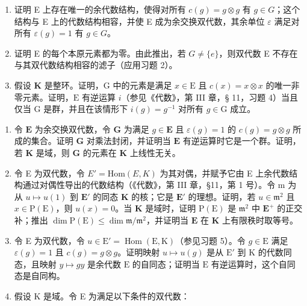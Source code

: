 \begin{enumerate}
\def\labelenumi{(\alph{enumi})}
\item
  证明 E 上存在唯一的余代数结构，使得对所有 \(c(g) = g \otimes g\) 有 \(g \in G\)；这个结构与 E 上的代数结构相容，并使 E 成为余交换双代数，其余单位 \(\varepsilon\) 满足对所有 \(\varepsilon(g) = 1\) 有 \(g \in G\)。
\item
  证明 E 的每个本原元素都为零。由此推出，若 \(G \neq \{e\}\)，则双代数 E 不存在与其双代数结构相容的滤子（应用习题 2）。
\item
  假设 \(\mathbf{K}\) 是整环。证明，\(\mathrm{G}\) 中的元素是满足 \(x\in \mathrm{E}\) 且 \(c(x) = x\otimes x\) 的唯一非零元素。证明，\(\mathrm{E}\) 有逆运算 \(i\)（参见《代数》，第 III 章，§ 11，习题 4）当且仅当 \(\mathrm{G}\) 是群，并且在该情形下 \(i(g) = g^{-1}\) 对所有 \(g\in \mathrm{G}\) 成立。
\end{enumerate}

\begin{enumerate}
\def\labelenumi{\arabic{enumi}.}
\setcounter{enumi}{3}
\item
  令 \(\mathbf{E}\) 为余交换双代数，令 \(\mathbf{G}\) 为满足 \(g \in \mathbf{E}\) 且 \(\varepsilon(g) = 1\) 的 \(c(g) = g \otimes g\) 所成的集合。证明 \(\mathbf{G}\) 对乘法封闭，并证明当 \(\mathbf{E}\) 有逆运算时它是一个群。证明，若 \(\mathbf{K}\) 是域，则 \(\mathbf{G}\) 的元素在 \(\mathbf{K}\) 上线性无关。
\item
  令 E 为双代数，令 \(E' = \text{Hom}(E, K)\) 为其对偶，并赋予它由 E 上余代数结构通过对偶性导出的代数结构（《代数》，第 III 章，§11，第 1 号）。令 m 为从 \(u \mapsto u(1)\) 到 \(\mathbf{E}'\) 的同态 \(\mathbf{K}\) 的核；它是 \(\mathbf{E}'\) 的理想。证明，若 \(u \in \mathfrak{m}^2\) 且 \(x \in \mathrm{P}(\mathrm{E})\)，则 \(u(x) = 0\)。当 \(\mathbf{K}\) 是域时，证明 \(\mathrm{P}(\mathrm{E})\) 是 \(\mathfrak{m}^2\) 中 \(\mathbf{E}^+\) 的正交补；推出 \(\dim \mathrm{P}(\mathrm{E}) \leqslant \dim \mathfrak{m} / \mathfrak{m}^2\)，并证明当 \(\mathbf{E}\) 在 \(\mathbf{K}\) 上有限秩时取等号。
\item
  令 E 为双代数，令 \(u \in \mathrm{E}' = \operatorname{Hom}(\mathrm{E}, \mathrm{K})\)（参见习题 5）。令 \(g \in \mathrm{E}\) 满足 \(\varepsilon(g) = 1\) 且 \(c(g) = g \otimes g\)。证明映射 \(u \mapsto u(g)\) 是从 \(\mathrm{E}'\) 到 \(\mathrm{K}\) 的代数同态，且映射 \(y \mapsto gy\) 是余代数 \(\mathrm{E}\) 的自同态；证明当 \(\mathrm{E}\) 有逆运算时，这个自同态是自同构。
\item
  假设 K 是域。令 E 为满足以下条件的双代数：
\end{enumerate}

